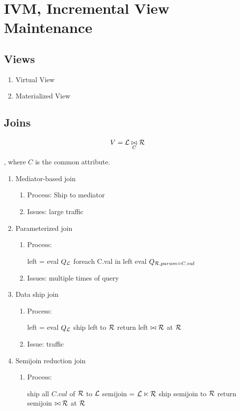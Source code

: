 \documentclass[a4paper]{report}
\begin{document}
\chapter{IVM, Incremental View Maintenance}
\section{Views}
\begin{enumerate}
\item Virtual View
\item Materialized View
\end{enumerate}


\section{Joins}
$$
V = \mathcal{L} \underset{C}\bowtie \mathcal{R}
$$

, where $C$ is the common attribute. 
\begin{enumerate}
\item Mediator-based join
\begin{enumerate}
\item Process: Ship to mediator
\item Issues: large traffic 
\end{enumerate}
\item Parameterized join
\begin{enumerate}
\item Process:
\begin{pseudo}
left = eval $Q_{\mathcal{L}}$
foreach C.val in left
  eval $Q_{\mathcal{R}, param=C.val}$
\end{pseudo}
\item Issues: multiple times of query
\end{enumerate}
\item Data ship join
\begin{enumerate}
\item Process:
\begin{pseudo}
left = eval $Q_{\mathcal{L}}$
ship left to $\mathcal{R}$
return left $\bowtie \mathcal{R}$ at $\mathcal{R}$
\end{pseudo}
\item Issue: traffic 
\end{enumerate}
\item Semijoin reduction join 
\begin{enumerate}
\item Process:
\begin{pseudo}
ship all $C.val$ of $\mathcal{R}$ to $\mathcal{L}$
semijoin = $\mathcal{L} \ltimes \mathcal{R}$
ship semijoin to $\mathcal{R}$
return semijoin $\bowtie \mathcal{R}$ at $\mathcal{R}$
\end{pseudo}
\end{enumerate}
\end{enumerate}
\end{document}
